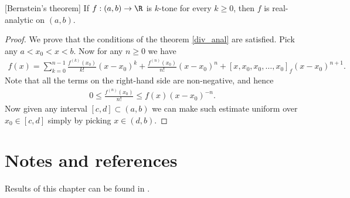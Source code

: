 \begin{lause}\label{bernstein_theorem}[Bernstein's theorem]
	If $f : (a, b) \to \R$ is $k$-tone for every $k \geq 0$, then $f$ is real-analytic on $(a, b)$.
\end{lause}
\begin{proof}
	We prove that the conditions of the theorem \ref{div_anal} are satisfied. Pick any $a < x_{0} < x < b$. Now for any $n \geq 0$ we have
	\begin{align*}
		f(x) = \sum_{k = 0}^{n - 1} \frac{f^{(k)}(x_{0})}{k!}(x - x_{0})^{k} + \frac{f^{(n)}(x_{0})}{n!} (x - x_{0})^{n} + [x, x_{0}, x_{0}, \ldots, x_{0}]_{f} (x - x_{0})^{n + 1}.
	\end{align*}
	Note that all the terms on the right-hand side are non-negative, and hence
	\begin{align*}
		0 \leq \frac{f^{(n)}(x_{0})}{n!} \leq f(x) (x - x_{0})^{-n}.
	\end{align*}
	Now given any interval $[c, d] \subset (a, b)$ we can make such estimate uniform over $x_{0} \in [c, d]$ simply by picking $x \in (d, b)$.
\end{proof}

\section{Notes and references}
Results of this chapter can be found in \cite{Boor2}.

